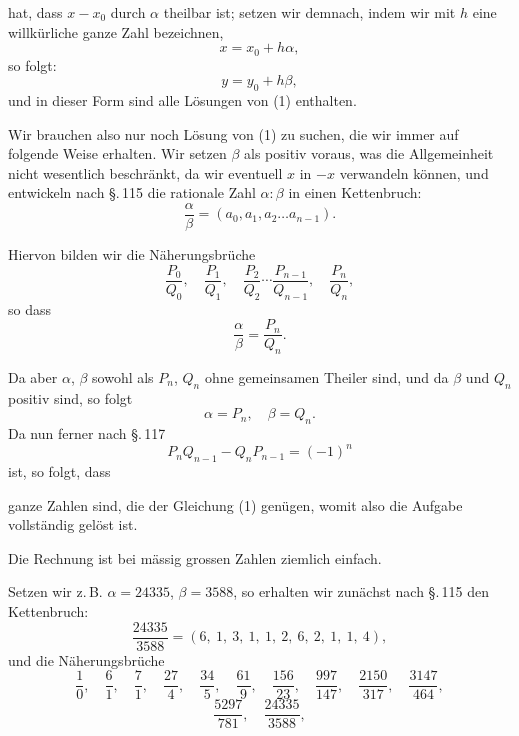 hat, dass $x - x_0$ durch $\alpha$ theilbar ist; setzen wir demnach, indem wir mit $h$ eine willkürliche ganze Zahl bezeichnen,
\[
x = x_0 + h \alpha,
\]
so folgt:
\[
y = y_0 + h \beta,
\]
und in dieser Form sind alle Lösungen von (1) enthalten.

Wir brauchen also nur noch  Lösung von (1) zu suchen, die wir immer auf folgende Weise erhalten. Wir setzen $\beta$ als positiv voraus, was die Allgemeinheit nicht wesentlich beschränkt, da wir eventuell $x$ in $-x$ verwandeln können, und entwickeln nach \S.\,115 die rationale Zahl $\alpha : \beta$ in einen Kettenbruch:
\[
\frac{\alpha}{\beta} = (a_0, a_1, a_2 \ldots a_{n-1}).
\]

Hiervon bilden wir die Näherungsbrüche
\[
\frac{P_0}{Q_0}, \quad \frac{P_1}{Q_1}, \quad \frac{P_2}{Q_2} \cdots \frac{P_{n-1}}{Q_{n-1}}, \quad \frac{P_n}{Q_n},
\]
so dass
\[
\frac{\alpha}{\beta} = \frac{P_n}{Q_n}.
\]

Da aber $\alpha$, $\beta$ sowohl als $P_n$, $Q_n$ ohne gemeinsamen Theiler sind, und da $\beta$ und $Q_n$ positiv sind, so folgt
\[
\alpha = P_n, \quad \beta = Q_n.
\]
Da nun ferner nach \S.\,117
\[
P_n Q_{n-1} - Q_n P_{n-1} = (-1)^n
\]
ist, so folgt, dass

ganze Zahlen sind, die der Gleichung (1) genügen, womit also die Aufgabe vollständig gelöst ist.

Die Rechnung ist bei mässig grossen Zahlen ziemlich einfach.

Setzen wir z.\,B. $\alpha = 24335$, $\beta = 3588$, so erhalten wir zunächst nach \S.\,115 den Kettenbruch:
\[
\frac{24335}{3588} = (6,\ 1,\ 3,\ 1,\ 1,\ 2,\ 6,\ 2,\ 1,\ 1,\ 4),
\]
und die Näherungsbrüche
\[
\frac{1}{0}, \quad \frac{6}{1}, \quad \frac{7}{1}, \quad \frac{27}{4}, \quad \frac{34}{5}, \quad \frac{61}{9}, \quad \frac{156}{23}, \quad \frac{997}{147}, \quad \frac{2150}{317}, \quad \frac{3147}{464},
\]
\[
\frac{5297}{781}, \quad \frac{24335}{3588},
\]
